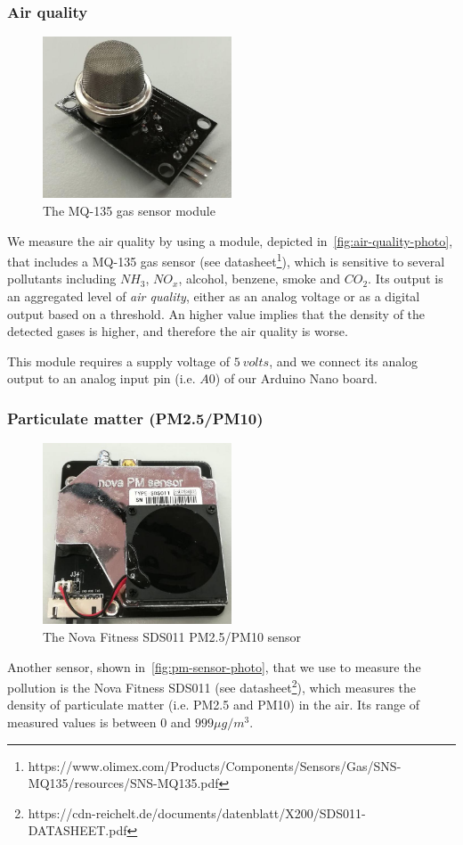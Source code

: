 \documentclass[12pt]{article}
\begin{document}
  \subsubsection{Air quality}
  \begin{figure}[H]
    \centering
    \includegraphics[width=0.5\textwidth]{images/mq-135.jpg}
    \caption{The MQ-135 gas sensor module}
    \label{fig:air-quality-photo}
  \end{figure}
  We measure the air quality by using a module, depicted in~\autoref{fig:air-quality-photo}, that includes a MQ-135 gas sensor (see datasheet\footnote{https://www.olimex.com/Products/Components/Sensors/Gas/SNS-MQ135/resources/SNS-MQ135.pdf}), which is sensitive to several pollutants including $NH_3$, $NO_x$, alcohol, benzene, smoke and $CO_2$.
  Its output is an aggregated level of \textit{air quality}, either as an analog voltage or as a digital output based on a threshold. An higher value implies that the density of the detected gases is higher, and therefore the air quality is worse.

  This module requires a supply voltage of $5\ volts$, and we connect its analog output to an analog input pin (i.e. $A0$) of our Arduino Nano board.

  \subsubsection{Particulate matter (PM2.5/PM10)}
  \begin{figure}[H]
    \centering
    \includegraphics[width=0.5\textwidth]{images/pm-sensor.jpg}
    \caption{The Nova Fitness SDS011 PM2.5/PM10 sensor}
    \label{fig:pm-sensor-photo}
  \end{figure}
  Another sensor, shown in~\autoref{fig:pm-sensor-photo}, that we use to measure the pollution is the Nova Fitness SDS011 (see datasheet\footnote{https://cdn-reichelt.de/documents/datenblatt/X200/SDS011-DATASHEET.pdf}), which measures the density of particulate matter (i.e. PM2.5 and PM10) in the air. Its range of measured values is between $0$ and $999\mu g/m^3$.
\end{document}
